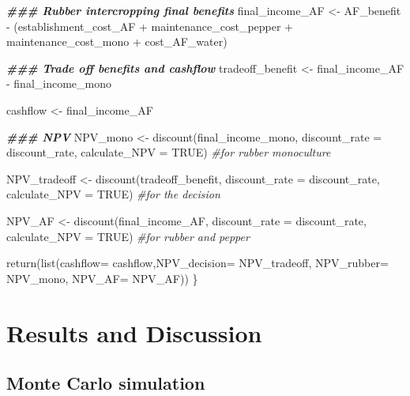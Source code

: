 \documentclass[
]{article}
\newenvironment{Shaded}{\begin{snugshade}}{\end{snugshade}}
\newcommand{\AttributeTok}[1]{\textcolor[rgb]{0.77,0.63,0.00}{#1}}
\newcommand{\CommentTok}[1]{\textcolor[rgb]{0.56,0.35,0.01}{\textit{#1}}}
\newcommand{\ConstantTok}[1]{\textcolor[rgb]{0.00,0.00,0.00}{#1}}
\newcommand{\DocumentationTok}[1]{\textcolor[rgb]{0.56,0.35,0.01}{\textbf{\textit{#1}}}}
\newcommand{\FunctionTok}[1]{\textcolor[rgb]{0.00,0.00,0.00}{#1}}
\newcommand{\NormalTok}[1]{#1}
\newcommand{\OtherTok}[1]{\textcolor[rgb]{0.56,0.35,0.01}{#1}}
\newcommand{\SpecialCharTok}[1]{\textcolor[rgb]{0.00,0.00,0.00}{#1}}
\begin{document}
\begin{Shaded}
\begin{Highlighting}[]
  \DocumentationTok{\#\#\# Rubber intercropping final benefits}
\NormalTok{  final\_income\_AF }\OtherTok{\textless{}{-}}\NormalTok{ AF\_benefit }\SpecialCharTok{{-}}\NormalTok{ (establishment\_cost\_AF }\SpecialCharTok{+}\NormalTok{ maintenance\_cost\_pepper}
                                                   \SpecialCharTok{+}\NormalTok{ maintenance\_cost\_mono }\SpecialCharTok{+}\NormalTok{ cost\_AF\_water)}

  \DocumentationTok{\#\#\# Trade off benefits and cashflow}
\NormalTok{tradeoff\_benefit }\OtherTok{\textless{}{-}}\NormalTok{ final\_income\_AF }\SpecialCharTok{{-}}\NormalTok{ final\_income\_mono}

\NormalTok{cashflow }\OtherTok{\textless{}{-}}\NormalTok{ final\_income\_AF}

  \DocumentationTok{\#\#\# NPV }
\NormalTok{NPV\_mono }\OtherTok{\textless{}{-}} \FunctionTok{discount}\NormalTok{(final\_income\_mono, }\AttributeTok{discount\_rate =}\NormalTok{ discount\_rate, }\AttributeTok{calculate\_NPV =} \ConstantTok{TRUE}\NormalTok{) }\CommentTok{\#for rubber monoculture}

\NormalTok{NPV\_tradeoff }\OtherTok{\textless{}{-}} \FunctionTok{discount}\NormalTok{(tradeoff\_benefit, }\AttributeTok{discount\_rate =}\NormalTok{ discount\_rate, }\AttributeTok{calculate\_NPV =} \ConstantTok{TRUE}\NormalTok{) }\CommentTok{\#for the decision }
  
\NormalTok{NPV\_AF }\OtherTok{\textless{}{-}} \FunctionTok{discount}\NormalTok{(final\_income\_AF, }\AttributeTok{discount\_rate =}\NormalTok{ discount\_rate, }\AttributeTok{calculate\_NPV =} \ConstantTok{TRUE}\NormalTok{) }\CommentTok{\#for rubber and pepper}
  
  \FunctionTok{return}\NormalTok{(}\FunctionTok{list}\NormalTok{(}\AttributeTok{cashflow=}\NormalTok{ cashflow,}\AttributeTok{NPV\_decision=}\NormalTok{ NPV\_tradeoff,}
              \AttributeTok{NPV\_rubber=}\NormalTok{ NPV\_mono, }\AttributeTok{NPV\_AF=}\NormalTok{ NPV\_AF))}
\NormalTok{\}}
\end{Highlighting}
\end{Shaded}

\hypertarget{results-and-discussion}{%
\section{\texorpdfstring{\textbf{Results and Discussion}}{Results and Discussion}}\label{results-and-discussion}}

\hypertarget{monte-carlo-simulation}{%
\subsection{\texorpdfstring{\textbf{Monte Carlo simulation}}{Monte Carlo simulation}}\label{monte-carlo-simulation}}
\end{document}
